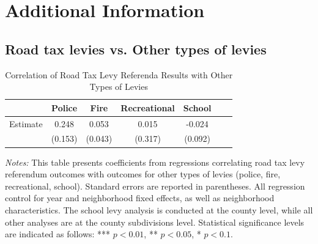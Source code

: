 \clearpage


\section{Additional Information} \label{sec:appxc}



\subsection{Road tax levies vs. Other types of levies}

\begin{table}[ht!]
    \centering
    \caption{Correlation of Road Tax Levy Referenda Results with Other Types of Levies}
    \begin{tabular}{lcccccc}
    \toprule
    & Police & Fire & Recreational & School \\
    \midrule
    Estimate & 0.248 & 0.053 & 0.015 & -0.024 \\
    & (0.153) & (0.043) & (0.317) & (0.092) \\
    \bottomrule
    \end{tabular}
    \begin{minipage}{\textwidth}
    \footnotesize
    \textit{Notes:} This table presents coefficients from regressions correlating road tax levy referendum outcomes with outcomes for other types of levies (police, fire, recreational, school). Standard errors are reported in parentheses. All regression control for year and neighborhood fixed effects, as well as neighborhood characteristics. The school levy analysis is conducted at the county level, while all other analyses are at the county subdivisions level. Statistical significance levels are indicated as follows: *** $p<0.01$, ** $p<0.05$, * $p<0.1$.
    \end{minipage}
\end{table}



